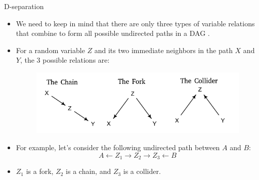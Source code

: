 \documentclass[handout]{beamer}
\begin{document}
\begin{frame}{D-separation}
\scriptsize{
\begin{itemize}

\item We need to keep in mind that there are only three types of variable relations that combine to form all possible undirected paths in a DAG \cite{mcelreath2020statistical}.

\item For a random variable $Z$ and its two immediate neighbors in the path $X$ and $Y$, the 3 possible relations are:

  \begin{figure}[h!]
	\centering
	\includegraphics[scale=0.65]{pics/collider.png}
	\end{figure} 


\item For example, let's consider the following undirected path between $A$ and $B$:
\begin{displaymath}
 A \leftarrow Z_1 \rightarrow Z_2 \rightarrow Z_3 \leftarrow B
\end{displaymath}

\item $Z_1$ is a fork, $Z_2$ is a chain, and $Z_3$ is a collider.

 
\end{itemize}



} 

\end{frame}
\end{document}
